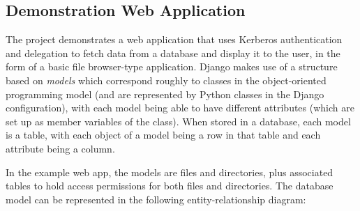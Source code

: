\documentclass{report}
\begin{document}
\subsection{Demonstration Web Application}
The project demonstrates a web application that uses Kerberos authentication and delegation to fetch data from a database and display it to the user, in the form of a basic file browser-type application. Django makes use of a structure based on \textit{models} which correspond roughly to classes in the object-oriented programming model (and are represented by Python classes in the Django configuration), with each model being able to have different attributes (which are set up as member variables of the class). When stored in a database, each model is a table, with each object of a model being a row in that table and each attribute being a column.

In the example web app, the models are files and directories, plus associated tables to hold access permissions for both files and directories. The database model can be represented in the following entity-relationship diagram:
\end{document}
